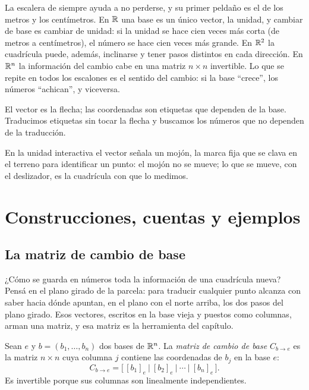 La escalera de siempre ayuda a no perderse, y su primer peldaño es el de los metros y los
centímetros. En \(\mathbb{R}\) una base es un único vector, la unidad, y
cambiar de base es cambiar de unidad: si la unidad se hace cien veces más corta (de metros a
centímetros), el número se hace cien veces más grande. En \(\mathbb{R}^2\) la cuadrícula puede, además,
inclinarse y tener pasos distintos en cada dirección. En \(\mathbb{R}^n\) la información del cambio
cabe en una matriz \(n\times n\) invertible. Lo que se repite en todos los escalones es el
sentido del cambio: si la base \enquote{crece}, los números \enquote{achican}, y viceversa.

\begin{idea}
El vector es la flecha; las coordenadas son etiquetas que dependen de la base. Traducimos
etiquetas sin tocar la flecha y buscamos los números que no dependen de la traducción.
\end{idea}

En la unidad interactiva el vector señala un mojón, la marca fija que se clava en el terreno
para identificar un punto: el mojón no se mueve; lo que se mueve, con el deslizador, es la
cuadrícula con que lo medimos.


\section{Construcciones, cuentas y ejemplos}

\subsection{La matriz de cambio de base}\label{sec:matriz-cambio}

¿Cómo se guarda en números toda la información de una cuadrícula nueva? Pensá en el plano
girado de la parcela: para traducir cualquier punto alcanza con saber hacia dónde apuntan, en el
plano con el norte arriba, los dos pasos del plano girado. Esos vectores, escritos en la base
vieja y puestos como columnas, arman una matriz, y esa matriz es la herramienta del capítulo.

\begin{definicion}\label{def:matriz-cambio-base}
Sean \(e\) y \(b=(b_1,\dots,b_n)\) dos bases de \(\mathbb{R}^n\). La \emph{matriz de cambio de base}
\(C_{b\to e}\) es la matriz \(n\times n\) cuya columna \(j\) contiene las coordenadas de
\(b_j\) en la base \(e\):
\[
  C_{b\to e}=\bigl[\,[b_1]_e\ \big|\ [b_2]_e\ \big|\ \cdots\ \big|\ [b_n]_e\,\bigr].
\]
Es invertible porque sus columnas son linealmente independientes.
\end{definicion}

